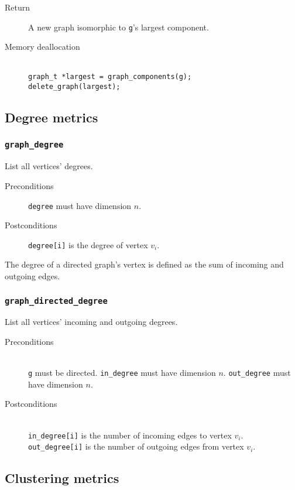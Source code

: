 \documentclass[a4paper,10pt]{article}
\begin{document}
\begin{description}
 \item[Return] A new graph isomorphic to \texttt{g}'s largest component.
 \item[Memory deallocation] ~\\
   \texttt{graph\_t *largest = graph\_components(g);} \\
   \texttt{delete\_graph(largest);}
\end{description}

\subsection{Degree metrics}
\subsubsection{\texttt{graph\_degree}}

List all vertices' degrees.

\begin{description}
 \item[Preconditions] \texttt{degree} must have dimension $n$.
 \item[Postconditions] \texttt{degree[i]} is the degree of vertex $v_i$.
\end{description}

The degree of a directed graph's vertex is defined as the sum of incoming
and outgoing edges.

\subsubsection{\texttt{graph\_directed\_degree}}

List all vertices' incoming and outgoing degrees.

\begin{description}
 \item[Preconditions] ~\\
   \texttt{g} must be directed.
   \texttt{in\_degree} must have dimension $n$.
   \texttt{out\_degree} must have dimension $n$.
 \item[Postconditions] ~\\
   \texttt{in\_degree[i]} is the number of incoming edges to vertex $v_i$.
   \texttt{out\_degree[i]} is the number of outgoing edges from vertex $v_i$.
\end{description}

\subsection{Clustering metrics}
\end{document}

